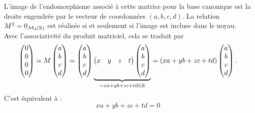 \begin{enumerate}
L'image de l'endomorphisme associé à cette matrice pour la base canonique est la droite engendrée par le vecteur de coordonnées $(a,b,c,d)$.\newline
La relation $M^2 = 0_{\mathcal{M}_4(\mathbb{R})}$ est réalisée si et seulement si l'image est incluse dans le noyau. Avec l'associativité du produit matriciel, cela se traduit par 
\[
\begin{pmatrix}
0\\ 0 \\ 0 \\0
 \end{pmatrix}
= M \begin{pmatrix}
a\\ b \\ c \\d
 \end{pmatrix}
= \begin{pmatrix}
    a \\ b \\ c \\d
  \end{pmatrix}
  \underset{= xa+yb+zc+td \in \mathbb{R}}{\underbrace{
  \begin{pmatrix}
    x & y & z & t
  \end{pmatrix}
  \begin{pmatrix}
    a\\ b \\ c \\d
  \end{pmatrix}}}
= (xa+yb+zc+td)  
\begin{pmatrix}
a \\ b \\ c \\ d
 \end{pmatrix}.
\]
C'est équivalent à :
\[xa+yb+zc+td=0\]
\end{enumerate}
